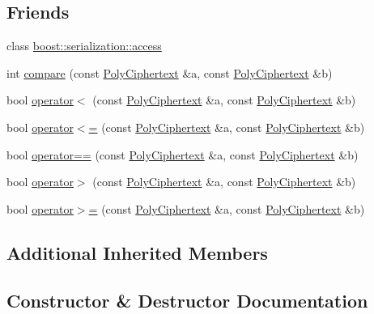 \subsection*{Friends}
\begin{DoxyCompactItemize}
\item 
class \hyperlink{classPolyCiphertext_ac98d07dd8f7b70e16ccb9a01abf56b9c}{boost\+::serialization\+::access}
\item 
int \hyperlink{classPolyCiphertext_a2a25d0399b812261d703d84fd3a21fb9}{compare} (const \hyperlink{classPolyCiphertext}{Poly\+Ciphertext} \&a, const \hyperlink{classPolyCiphertext}{Poly\+Ciphertext} \&b)
\item 
bool \hyperlink{classPolyCiphertext_ab5a64cd27170239ff233b1a17f5b0de9}{operator$<$} (const \hyperlink{classPolyCiphertext}{Poly\+Ciphertext} \&a, const \hyperlink{classPolyCiphertext}{Poly\+Ciphertext} \&b)
\item 
bool \hyperlink{classPolyCiphertext_a3199ddbed52caee0d591894b60389144}{operator$<$=} (const \hyperlink{classPolyCiphertext}{Poly\+Ciphertext} \&a, const \hyperlink{classPolyCiphertext}{Poly\+Ciphertext} \&b)
\item 
bool \hyperlink{classPolyCiphertext_a441251a147b7c15eccf64048ba9fb0fe}{operator==} (const \hyperlink{classPolyCiphertext}{Poly\+Ciphertext} \&a, const \hyperlink{classPolyCiphertext}{Poly\+Ciphertext} \&b)
\item 
bool \hyperlink{classPolyCiphertext_a2a58b35102feabe6b31bacdd457d7884}{operator$>$} (const \hyperlink{classPolyCiphertext}{Poly\+Ciphertext} \&a, const \hyperlink{classPolyCiphertext}{Poly\+Ciphertext} \&b)
\item 
bool \hyperlink{classPolyCiphertext_ab76ec0162c70ea00a11f921d617d102d}{operator$>$=} (const \hyperlink{classPolyCiphertext}{Poly\+Ciphertext} \&a, const \hyperlink{classPolyCiphertext}{Poly\+Ciphertext} \&b)
\end{DoxyCompactItemize}
\subsection*{Additional Inherited Members}


\subsection{Constructor \& Destructor Documentation}
\mbox{\label{classPolyCiphertext_ae081c8472f7ec80bea8793401b605436}} 
